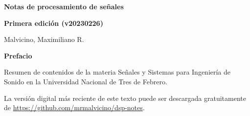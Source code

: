 \documentclass[a5paper,12pt,twoside]{book}
\begin{document}
\pagestyle{fancy}
\fancyhf{}
\chead{\scriptsize \nouppercase\rightmark}
\cfoot{\scriptsize \thepage}
\renewcommand{\headrulewidth}{0pt}

\frontmatter
% 

\begin{center}
    \begin{Huge}
        \textbf{Notas de procesamiento de señales}
    \end{Huge}

    \vspace{1cm}
    \textbf{Primera edición (v20230226)}
    \vspace{2cm}

    \begin{Large}
        Malvicino, Maximiliano R.
    \end{Large}
\end{center}

\clearpage
\noindent
\textbf{Prefacio}

Resumen de contenidos de la materia Señales y Sistemas para Ingeniería de Sonido en la Universidad Nacional de Tres de Febrero.

La versión digital más reciente de este texto puede ser descargada gratuitamente de \url{https://github.com/mrmalvicino/dsp-notes}.

\renewcommand{\spanishappendixname}{Anexo}
\tableofcontents

\mainmatter
{}





\end{document}
